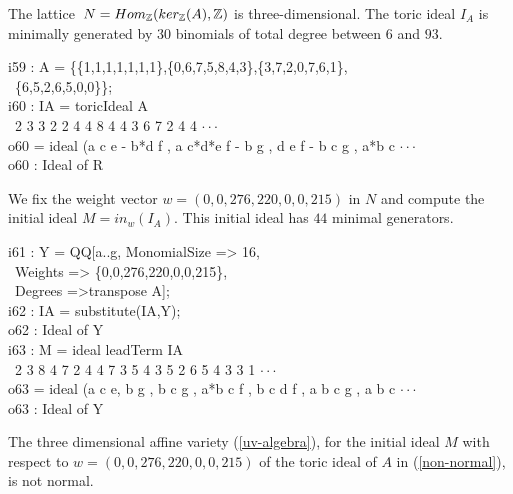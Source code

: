 The lattice $\,N =  Hom_{\mathbb{Z}} ( ker_{\mathbb{Z}}(A), \mathbb{Z})$
is three-dimensional. The toric ideal $I_A$ is minimally 
generated by $30$ binomials of total degree between $6$ and $93$.

\beginOutput
i59 : A = \{\{1,1,1,1,1,1,1\},\{0,6,7,5,8,4,3\},\{3,7,2,0,7,6,1\},\\
\         \{6,5,2,6,5,0,0\}\};\\
\endOutput
\beginOutput
i60 : IA = toricIdeal A\\
\emptyLine
\              2 3       3 2   2     4 4    8 4   4 3 6    7 2 4     4  $\cdot\cdot\cdot$\\
o60 = ideal (a c e - b*d f , a c*d*e f  - b g , d e f  - b c g , a*b c $\cdot\cdot\cdot$\\
\emptyLine
o60 : Ideal of R\\
\endOutput

We fix the weight vector $w = (0,0,276,220,0,0,215)$ in $N$ and 
compute the initial ideal $M = in_w(I_A)$. This initial ideal 
has $44$ minimal generators.

\beginOutput
i61 : Y = QQ[a..g, MonomialSize => 16,\\
\                 Weights => \{0,0,276,220,0,0,215\},\\
\                 Degrees =>transpose A];\\
\endOutput
\beginOutput
i62 : IA = substitute(IA,Y);\\
\emptyLine
o62 : Ideal of Y\\
\endOutput
\beginOutput
i63 : M = ideal leadTerm IA\\
\emptyLine
\              2 3    8 4   7 2 4     4 7 3   5 4 3 5   2 6 5 4   3 3 1 $\cdot\cdot\cdot$\\
o63 = ideal (a c e, b g , b c g , a*b c f , b c d f , a b c g , a b c  $\cdot\cdot\cdot$\\
\emptyLine
o63 : Ideal of Y\\
\endOutput

\begin{proposition} The three dimensional affine variety
  (\ref{uv-algebra}), for the initial ideal $M$ with respect to $w =
  (0,0,276,220,0,0,215)$ of the toric ideal of $A$ in
  (\ref{non-normal}), is not normal.
\end{proposition} 

